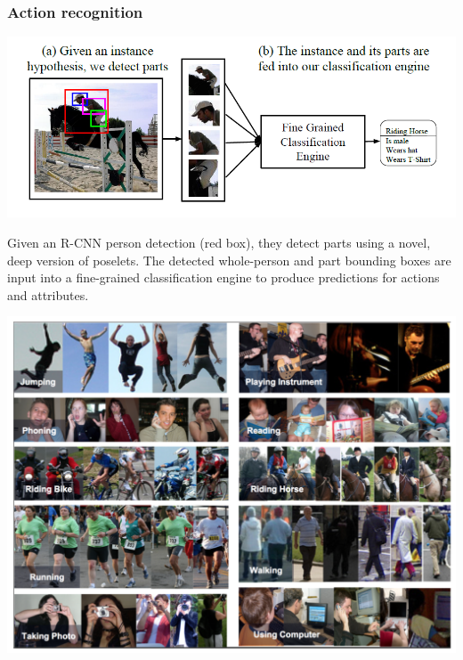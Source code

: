 \begin{frame}[allowframebreaks]
	\frametitle{Action recognition}
	
	
	\bigskip
	
	\begin{center}
		\includegraphics[scale=0.6]{figs/action_recognition_structure}
	\end{center}

\bigskip 

Given an R-CNN person detection (red box), they detect parts using a
novel, deep version of poselets. The detected whole-person and part bounding boxes are input into a fine-grained classification engine to produce predictions for actions and attributes.
	
	\framebreak
	
	\begin{center}
		\includegraphics[scale=0.6]{figs/results_picture_action_detection}
	\end{center}
	
\end{frame}
